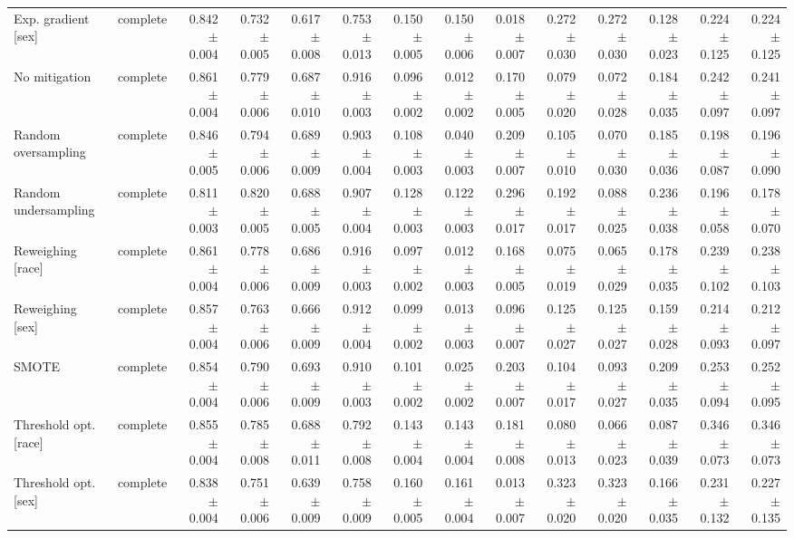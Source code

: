 \begin{table}[t]
{\begin{tabular}{llrrrrrrrrrrrr}
Exp. gradient {[}sex{]} & complete & 0.842 $\pm$ 0.004 & 0.732 $\pm$ 0.005 & 0.617 $\pm$ 0.008 & 0.753 $\pm$ 0.013 & 0.150 $\pm$ 0.005 & 0.150 $\pm$ 0.006 & 0.018 $\pm$ 0.007 & 0.272 $\pm$ 0.030 & 0.272 $\pm$ 0.030 & 0.128 $\pm$ 0.023 & 0.224 $\pm$ 0.125 & 0.224 $\pm$ 0.125 \\
No mitigation & complete & 0.861 $\pm$ 0.004 & 0.779 $\pm$ 0.006 & 0.687 $\pm$ 0.010 & 0.916 $\pm$ 0.003 & 0.096 $\pm$ 0.002 & 0.012 $\pm$ 0.002 & 0.170 $\pm$ 0.005 & 0.079 $\pm$ 0.020 & 0.072 $\pm$ 0.028 & 0.184 $\pm$ 0.035 & 0.242 $\pm$ 0.097 & 0.241 $\pm$ 0.097 \\
Random oversampling & complete & 0.846 $\pm$ 0.005 & 0.794 $\pm$ 0.006 & 0.689 $\pm$ 0.009 & 0.903 $\pm$ 0.004 & 0.108 $\pm$ 0.003 & 0.040 $\pm$ 0.003 & 0.209 $\pm$ 0.007 & 0.105 $\pm$ 0.010 & 0.070 $\pm$ 0.030 & 0.185 $\pm$ 0.036 & 0.198 $\pm$ 0.087 & 0.196 $\pm$ 0.090 \\
Random undersampling & complete & 0.811 $\pm$ 0.003 & 0.820 $\pm$ 0.005 & 0.688 $\pm$ 0.005 & 0.907 $\pm$ 0.004 & 0.128 $\pm$ 0.003 & 0.122 $\pm$ 0.003 & 0.296 $\pm$ 0.017 & 0.192 $\pm$ 0.017 & 0.088 $\pm$ 0.025 & 0.236 $\pm$ 0.038 & 0.196 $\pm$ 0.058 & 0.178 $\pm$ 0.070 \\
Reweighing {[}race{]} & complete & 0.861 $\pm$ 0.004 & 0.778 $\pm$ 0.006 & 0.686 $\pm$ 0.009 & 0.916 $\pm$ 0.003 & 0.097 $\pm$ 0.002 & 0.012 $\pm$ 0.003 & 0.168 $\pm$ 0.005 & 0.075 $\pm$ 0.019 & 0.065 $\pm$ 0.029 & 0.178 $\pm$ 0.035 & 0.239 $\pm$ 0.102 & 0.238 $\pm$ 0.103 \\
Reweighing {[}sex{]} & complete & 0.857 $\pm$ 0.004 & 0.763 $\pm$ 0.006 & 0.666 $\pm$ 0.009 & 0.912 $\pm$ 0.004 & 0.099 $\pm$ 0.002 & 0.013 $\pm$ 0.003 & 0.096 $\pm$ 0.007 & 0.125 $\pm$ 0.027 & 0.125 $\pm$ 0.027 & 0.159 $\pm$ 0.028 & 0.214 $\pm$ 0.093 & 0.212 $\pm$ 0.097 \\
SMOTE & complete & 0.854 $\pm$ 0.004 & 0.790 $\pm$ 0.006 & 0.693 $\pm$ 0.009 & 0.910 $\pm$ 0.003 & 0.101 $\pm$ 0.002 & 0.025 $\pm$ 0.002 & 0.203 $\pm$ 0.007 & 0.104 $\pm$ 0.017 & 0.093 $\pm$ 0.027 & 0.209 $\pm$ 0.035 & 0.253 $\pm$ 0.094 & 0.252 $\pm$ 0.095 \\
Threshold opt. {[}race{]} & complete & 0.855 $\pm$ 0.004 & 0.785 $\pm$ 0.008 & 0.688 $\pm$ 0.011 & 0.792 $\pm$ 0.008 & 0.143 $\pm$ 0.004 & 0.143 $\pm$ 0.004 & 0.181 $\pm$ 0.008 & 0.080 $\pm$ 0.013 & 0.066 $\pm$ 0.023 & 0.087 $\pm$ 0.039 & 0.346 $\pm$ 0.073 & 0.346 $\pm$ 0.073 \\
Threshold opt. {[}sex{]} & complete & 0.838 $\pm$ 0.004 & 0.751 $\pm$ 0.006 & 0.639 $\pm$ 0.009 & 0.758 $\pm$ 0.009 & 0.160 $\pm$ 0.005 & 0.161 $\pm$ 0.004 & 0.013 $\pm$ 0.007 & 0.323 $\pm$ 0.020 & 0.323 $\pm$ 0.020 & 0.166 $\pm$ 0.035 & 0.231 $\pm$ 0.132 & 0.227 $\pm$ 0.135 \\

\end{tabular}}
\end{table}

